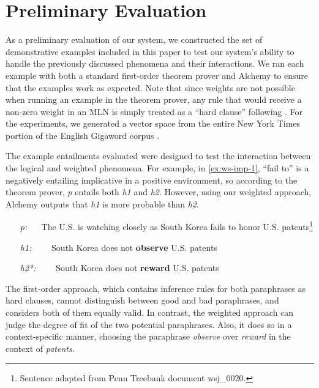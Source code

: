 \section{Preliminary Evaluation}

As a preliminary evaluation of our system, we constructed the set of 
demonstrative examples included in this paper to test our system's ability
to handle the previously discussed phenomena and their interactions.  We ran
each example with both a standard first-order theorem prover and Alchemy to
ensure that the examples work as expected. Note that since weights are not
possible when running an example in the theorem prover, any rule that would 
receive a non-zero weight in an MLN is simply treated as a ``hard clause'' following
\citet{bos:emnlp2005}.  For the experiments, we generated a vector space from
the entire New York Times portion of the English Gigaword corpus
\citep{graff:gigaword2003}.

The example entailments evaluated were designed to test the interaction between
the logical and weighted phenomena.  For example, in \eqref{ex:ws-imp-1}, ``fail
to'' is a negatively entailing implicative in a positive environment, so according 
to the theorem prover, $p$ entails both {\it h1} and {\it h2}.  However, using our
weighted approach, Alchemy outputs that {\it h1} is more probable than {\it h2}. 
\begin{covex}\label{ex:ws-imp-1}
\begin{itemize}
  \item[{\it p:}]~~    The U.S. is watching closely as South Korea fails to honor
  U.S. patents\footnote{Sentence adapted from Penn Treebank document wsj\_0020.}
  \item[{\it h1:}]~~~~South Korea does not {\bf observe} U.S. patents
  \item[{\it h2*:}]~~~~South Korea does not {\bf reward} U.S. patents
\end{itemize}
\end{covex}
The first-order approach, which contains inference rules for both
paraphrases as hard clauses, cannot distinguish between
good and bad paraphrases, and considers both of them equally valid. In
contrast, the weighted approach can judge the degree of fit of the two potential
paraphrases. Also, it does so in a context-specific manner, choosing
the paraphrase {\it observe} over {\it reward} in the context of
{\it patents}. 

